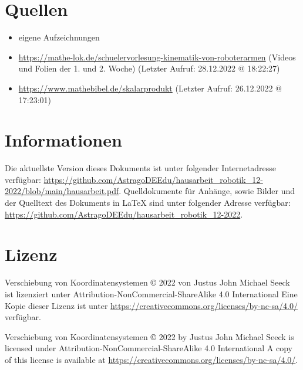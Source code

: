 \documentclass{article}
\begin{document}


    \newpage

    \section{Quellen}

    \begin{itemize}
        \item eigene Aufzeichnungen
        \item \url{https://mathe-lok.de/schuelervorlesung-kinematik-von-roboterarmen} (Videos und Folien der 1. und 2. Woche) (Letzter Aufruf: 28.12.2022 @ 18:22:27)
        \item \url{https://www.mathebibel.de/skalarprodukt} (Letzter Aufruf: 26.12.2022 @ 17:23:01)
    \end{itemize}

    \section{Informationen}

    Die aktuellste Version dieses Dokuments ist unter folgender Internetadresse verfügbar:
    \url{https://github.com/AstragoDEEdu/hausarbeit_robotik_12-2022/blob/main/hausarbeit.pdf}.
    Quelldokumente für Anhänge, sowie Bilder und der Quelltext des Dokuments in \LaTeX{} sind unter folgender Adresse verfügbar:
    \url{https://github.com/AstragoDEEdu/hausarbeit_robotik_12-2022}.

    \section{Lizenz}

    Verschiebung von Koordinatensystemen © 2022 von Justus John Michael Seeck ist lizenziert unter Attribution-NonCommercial-ShareAlike 4.0 International
    Eine Kopie dieser Lizenz ist unter \url{https://creativecommons.org/licenses/by-nc-sa/4.0/} verfügbar.

    Verschiebung von Koordinatensystemen © 2022 by Justus John Michael Seeck is licensed under Attribution-NonCommercial-ShareAlike 4.0 International
    A copy of this license is available at \url{https://creativecommons.org/licenses/by-nc-sa/4.0/}.
\end{document}

